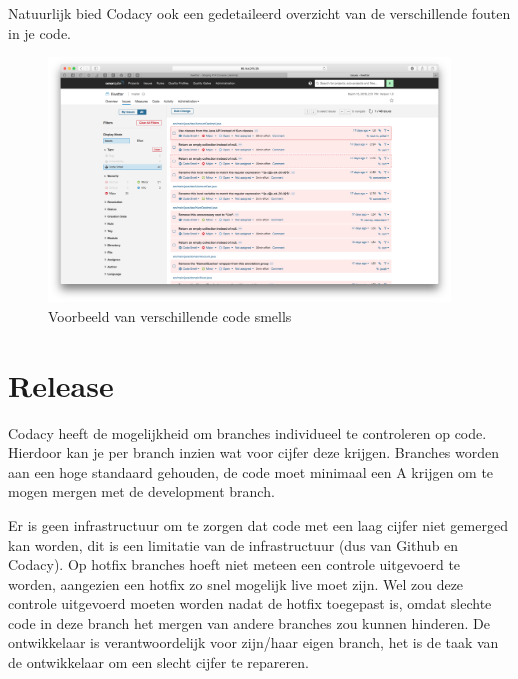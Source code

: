 Natuurlijk bied Codacy ook een gedetaileerd overzicht van de verschillende fouten in je code.
\begin{figure}[H]
	\centering
	\centering\includegraphics[width=0.95\textwidth]{images/Codacy}
	\caption{Voorbeeld van verschillende code smells}
\end{figure}

\section{Release}
Codacy heeft de mogelijkheid om branches individueel te controleren op code.
Hierdoor kan je per branch inzien wat voor cijfer deze krijgen.
Branches worden aan een hoge standaard gehouden, de code moet minimaal een A krijgen om te mogen mergen met de development branch.

Er is geen infrastructuur om te zorgen dat code met een laag cijfer niet gemerged kan worden, dit is een limitatie van de infrastructuur (dus van Github en Codacy).
Op hotfix branches hoeft niet meteen een controle uitgevoerd te worden, aangezien een hotfix zo snel mogelijk live moet zijn.
Wel zou deze controle uitgevoerd moeten worden nadat de hotfix toegepast is, omdat slechte code in deze branch het mergen van andere branches zou kunnen hinderen.
De ontwikkelaar is verantwoordelijk voor zijn/haar eigen branch, het is de taak van de ontwikkelaar om een slecht cijfer te repareren.
